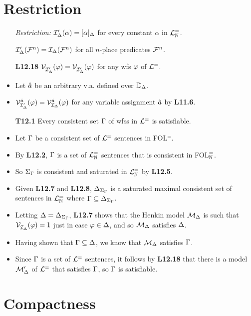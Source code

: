 \documentclass[a4paper, 11pt]{article} %
\begin{document}
\section*{Restriction}

\begin{itemize}
  \item[\it Restriction:] $\mathcal{I}'_{\Delta}(\alpha)=[\alpha]_{\Delta}$ for every constant $\alpha$ in $\mathcal{L}^{=}_{\mathbb{N}}$.
    \item[] $\mathcal{I}'_{\Delta}(\mathcal{F}^n)=\mathcal{I}_{\Delta}(\mathcal{F}^n)$ for all $n$-place predicates $\mathcal{F}^n$. 
  \item[\bf L12.18] $\mathcal{V}_{\mathcal{I}'_{\Delta}}^{}(\varphi) = \mathcal{V}_{\mathcal{I}'_{\Delta}}^{}(\varphi)$ for any wfs $\varphi$ of $\mathcal{L}^=$.
    \item Let $\hat{a}$ be an arbitrary v.a. defined over $\mathbb{D}_{\Delta}$. 
    \item $\mathcal{V}_{\mathcal{I}'_{\Delta}}^{\hat{a}}(\varphi) = \mathcal{V}_{\mathcal{I}_{\Delta}}^{\hat{a}}(\varphi)$ for any variable assignment $\hat{a}$ by \textbf{L11.6}.
  \item[\bf T12.1] Every consistent set $\Gamma$ of wfss in $\mathcal{L}^=$ is satisfiable.
    \item Let $\Gamma$ be a consistent set of $\mathcal{L}^=$ sentences in FOL$^=$.
    \item By \textbf{L12.2}, $\Gamma$ is a set of $\mathcal{L}^{=}_{\mathbb{N}}$ sentences that is consistent in FOL$^=_{\mathbb{N}}$.
    \item So $\Sigma_{\Gamma}$ is consistent and saturated in $\mathcal{L}^{=}_{\mathbb{N}}$ by \textbf{L12.5}. 
    \item Given \textbf{L12.7} and \textbf{L12.8}, $\Delta_{\Sigma_{\Gamma}}$ is a saturated maximal consistent set of sentences in $\mathcal{L}^{=}_{\mathbb{N}}$ where $\Gamma\subseteq\Delta_{\Sigma_{\Gamma}}$.
    \item Letting $\Delta=\Delta_{\Sigma_{\Gamma}}$, \textbf{L12.7} shows that the Henkin model $\mathcal{M}_{\Delta}$ is such that $\mathcal{V}_{\mathcal{I}_{\Delta}}^{}{}(\varphi) = 1$ just in case $\varphi\in\Delta$, and so $\mathcal{M}_{\Delta}$ satisfies $\Delta$.
    \item Having shown that $\Gamma\subseteq\Delta$, we know that $\mathcal{M}_{\Delta}$ satisfies $\Gamma$.
    \item Since $\Gamma$ is a set of $\mathcal{L}^=$ sentences, it follows by \textbf{L12.18} that there is a model $\mathcal{M}'_{\Delta}$ of $\mathcal{L}^=$ that satisfies $\Gamma$, so $\Gamma$ is satisfiable.
\end{itemize}


\section*{Compactness}
\end{document}
